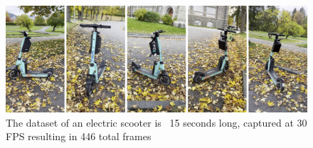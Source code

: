 \begin{figure}[h]
    \centering
    \includegraphics[width=1.0\textwidth]{figures/tier.png}
    \caption{The dataset of an electric scooter is ~15 seconds long, captured at 30 FPS resulting in 446 total frames}
    \label{fig:tier}
\end{figure}
